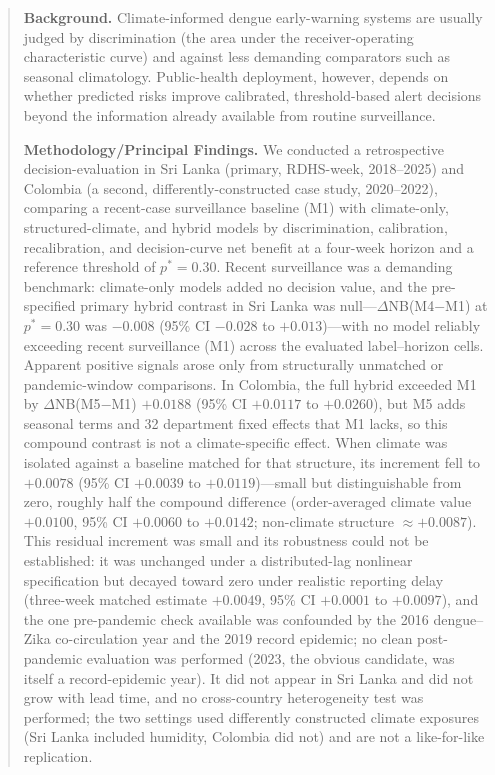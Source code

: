 \documentclass[11pt,a4paper]{article}
\begin{document}
\begin{abstract}
\noindent\textbf{Background.}
Climate-informed dengue early-warning systems are usually judged by discrimination (the area under the receiver-operating characteristic curve) and against less demanding comparators such as seasonal climatology. Public-health deployment, however, depends on whether predicted risks improve calibrated, threshold-based alert decisions beyond the information already available from routine surveillance.

\noindent\textbf{Methodology/Principal Findings.}
We conducted a retrospective decision-evaluation in Sri Lanka (primary, RDHS-week, 2018--2025) and Colombia (a second, differently-constructed case study, 2020--2022), comparing a recent-case surveillance baseline (M1) with climate-only, structured-climate, and hybrid models by discrimination, calibration, recalibration, and decision-curve net benefit at a four-week horizon and a reference threshold of $p^*=0.30$. Recent surveillance was a demanding benchmark: climate-only models added no decision value, and the pre-specified primary hybrid contrast in Sri Lanka was null---$\Delta$NB(M4$-$M1) at $p^*=0.30$ was $-0.008$ (95\% CI $-0.028$ to $+0.013$)---with no model reliably exceeding recent surveillance (M1) across the evaluated label--horizon cells. Apparent positive signals arose only from structurally unmatched or pandemic-window comparisons. In Colombia, the full hybrid exceeded M1 by $\Delta$NB(M5$-$M1) $+0.0188$ (95\% CI $+0.0117$ to $+0.0260$), but M5 adds seasonal terms and 32 department fixed effects that M1 lacks, so this compound contrast is not a climate-specific effect. When climate was isolated against a baseline matched for that structure, its increment fell to $+0.0078$ (95\% CI $+0.0039$ to $+0.0119$)---small but distinguishable from zero, roughly half the compound difference (order-averaged climate value $+0.0100$, 95\% CI $+0.0060$ to $+0.0142$; non-climate structure $\approx+0.0087$). This residual increment was small and its robustness could not be established: it was unchanged under a distributed-lag nonlinear specification but decayed toward zero under realistic reporting delay (three-week matched estimate $+0.0049$, 95\% CI $+0.0001$ to $+0.0097$), and the one pre-pandemic check available was confounded by the 2016 dengue--Zika co-circulation year and the 2019 record epidemic; no clean post-pandemic evaluation was performed (2023, the obvious candidate, was itself a record-epidemic year). It did not appear in Sri Lanka and did not grow with lead time, and no cross-country heterogeneity test was performed; the two settings used differently constructed climate exposures (Sri Lanka included humidity, Colombia did not) and are not a like-for-like replication.


\end{abstract}
\end{document}
